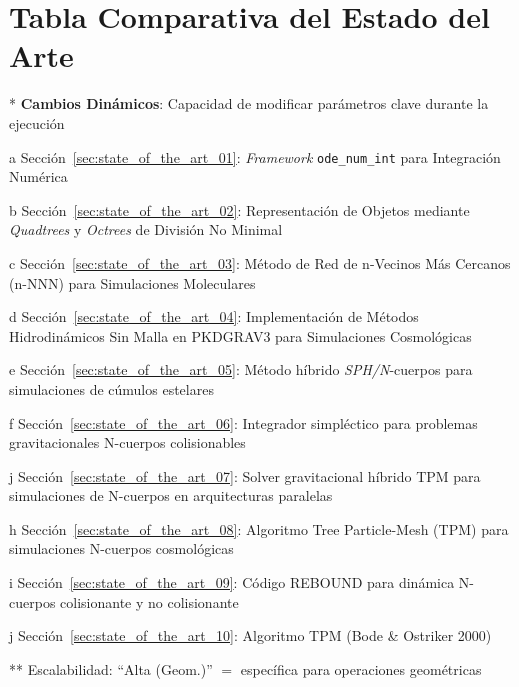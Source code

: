 \section{Tabla Comparativa del Estado del Arte}
\newlength{\firstcolwidth}
\setlength{\firstcolwidth}{2.8cm}
\newlength{\desccolwidth}
\setlength{\desccolwidth}{\dimexpr\textwidth-\firstcolwidth-3.5cm\relax}

\begin{ThreePartTable}
\renewcommand{\arraystretch}{1.15} %
\scriptsize %

\begin{TableNotes}
    \item[*] \textbf{Cambios Dinámicos}: Capacidad de modificar parámetros clave durante la ejecución
    \item[a] Sección~\ref{sec:state_of_the_art_01}: \textit{Framework} \texttt{ode\_num\_int} para Integración Numérica
    \item[b] Sección~\ref{sec:state_of_the_art_02}: Representación de Objetos mediante \textit{Quadtrees} y \textit{Octrees} de División No Minimal
    \item[c] Sección~\ref{sec:state_of_the_art_03}: Método de Red de n-Vecinos Más Cercanos (n-NNN) para Simulaciones Moleculares
    \item[d] Sección~\ref{sec:state_of_the_art_04}: Implementación de Métodos Hidrodinámicos Sin Malla en PKDGRAV3 para Simulaciones Cosmológicas
    \item[e] Sección~\ref{sec:state_of_the_art_05}: Método híbrido \textit{SPH/N}-cuerpos para simulaciones de cúmulos estelares
    \item[f] Sección~\ref{sec:state_of_the_art_06}: Integrador simpléctico para problemas gravitacionales N-cuerpos colisionables
    \item[j] Sección~\ref{sec:state_of_the_art_07}: Solver gravitacional híbrido TPM para simulaciones de N-cuerpos en arquitecturas paralelas
    \item[h] Sección~\ref{sec:state_of_the_art_08}: Algoritmo Tree Particle-Mesh (TPM) para simulaciones N-cuerpos cosmológicas
    \item[i] Sección~\ref{sec:state_of_the_art_09}: Código REBOUND para dinámica N-cuerpos colisionante y no colisionante
    \item[j] Sección~\ref{sec:state_of_the_art_10}: Algoritmo TPM (Bode \& Ostriker 2000)
    \item[**] Escalabilidad: ``Alta (Geom.)'' $=$ específica para operaciones geométricas
\end{TableNotes}


\end{ThreePartTable}
